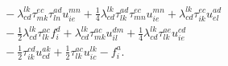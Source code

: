 \begin{align}
\begin{aligned}
        \\
        &\qquad
        - \lambda^{lk}_{cd} \tau^{ec}_{mk} \tau^{ad}_{ln} u^{mn}_{ie}
        + \frac{1}{4}\lambda^{lk}_{cd} \tau^{ad}_{lk} \tau^{ec}_{mn} u^{mn}_{ie}
        + \lambda^{lk}_{cd} \tau^{ec}_{ik} u^{ad}_{el}
        \\
        &\qquad
        - \frac{1}{2}\lambda^{lk}_{cd} \tau^{ac}_{lk} f^{d}_{i}
        + \lambda^{lk}_{cd} \tau^{ac}_{mk} u^{dm}_{il}
        + \frac{1}{4}\lambda^{lk}_{cd} \tau^{ae}_{lk} u^{cd}_{ie}
        \\
        &\qquad
        - \frac{1}{2}\tau^{cd}_{ik} u^{ak}_{cd}
        + \frac{1}{2}\tau^{ac}_{lk} u^{lk}_{ic}
        - f^{a}_{i}.
    \end{aligned}
\end{align}